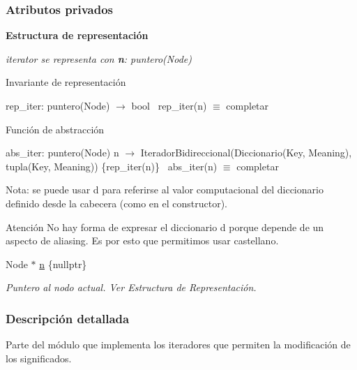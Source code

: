 \subsubsection*{Atributos privados}
\begin{Indent}\textbf{ Estructura de representación}\par
{\em iterator se representa con {\bfseries n}\+: puntero(\+Node)

\begin{DoxyParagraph}{Invariante de representación}

\end{DoxyParagraph}
rep\+\_\+iter\+: puntero(\+Node) $\to$ bool~\newline
rep\+\_\+iter(n) $\equiv$ completar

\begin{DoxyParagraph}{Función de abstracción}

\end{DoxyParagraph}
abs\+\_\+iter\+: puntero(\+Node) n $\to$ Iterador\+Bidireccional(Diccionario(Key, Meaning), tupla(Key, Meaning)) \{rep\+\_\+iter(n)\}~\newline
abs\+\_\+iter(n) $\equiv$ completar

Nota\+: se puede usar {\ttfamily d} para referirse al valor computacional del diccionario definido desde la cabecera (como en el constructor).

\begin{DoxyAttention}{Atención}
No hay forma de expresar el diccionario {\ttfamily d} porque depende de un aspecto de aliasing. Es por esto que permitimos usar castellano. 
\end{DoxyAttention}
}\begin{DoxyCompactItemize}
\item 
Node $\ast$ \hyperlink{classaed2_1_1iterator_1_1iterator_a13e1e7981af004da89fe8feecfb384da_a13e1e7981af004da89fe8feecfb384da}{n} \{nullptr\}
\begin{DoxyCompactList}\small\item\em Puntero al nodo actual. Ver Estructura de Representación. \end{DoxyCompactList}\end{DoxyCompactItemize}
\end{Indent}


\subsubsection{Descripción detallada}
Parte del módulo que implementa los iteradores que permiten la modificación de los significados. 

